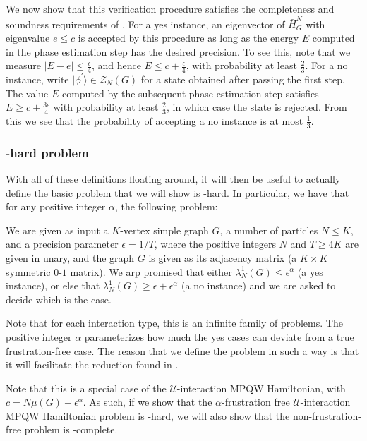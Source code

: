 \documentclass[../thesis-main/thesis-main]{subfiles}
\begin{document}
We now show that this verification procedure satisfies the completeness and soundness requirements of . For a yes instance, an eigenvector of $\bar{H}_{G}^{N}$ with eigenvalue $e\leq c$ is accepted by this procedure as long as the energy $E$ computed in the phase estimation step has the desired precision. To see this, note that we measure $\left|E-e\right|\leq\frac{\epsilon}{4}$, and hence $E\leq c+\frac{\epsilon}{4}$, with probability at least $\frac{2}{3}$.  For a no instance, write $|\phi^{\prime}\rangle\in\mathcal{Z}_{N}(G)$ for a state obtained after passing the first step. The value $E$ computed by the subsequent phase estimation step satisfies $E\geq c+\frac{3\epsilon}{4}$ with probability at least $\frac{2}{3}$, in which case the state is rejected. From this we see that the probability of accepting a no instance is at most $\frac{1}{3}$.





\subsubsection{\QMA-hard problem}

With all of these definitions floating around, it will then be useful to actually define the basic problem that we will show is \QMA-hard.  In particular, we have that for any positive integer $\alpha$, the following problem:

\begin{problem}
  We are given as input a $K$-vertex simple graph $G$, a number of particles $N\leq K$, and a precision parameter $\epsilon = 1/T$, where the positive integers $N$ and $T \geq 4K$ are given in unary, and the graph $G$ is given as its adjacency matrix (a $K\times K$ symmetric $0$-$1$ matrix). We arp promised that either $\lambda_N^1(G) \leq \epsilon^\alpha$ (a yes instance), or else that $\lambda_N^1(G) \geq \epsilon + \epsilon^\alpha$ (a no instance) and we are asked to decide which is the case.
\end{problem}

Note that for each interaction type, this is an infinite family of problems.  The positive integer $\alpha$ parameterizes how much the yes cases can deviate from a true frustration-free case.  The reason that we define the problem in such a way is that it will facilitate the reduction found in .

Note that this is a special case of the $\mathcal{U}$-interaction MPQW Hamiltonian, with $c = N\mu(G) + \epsilon^\alpha$.  As such, if we show that the $\alpha$-frustration free $\mathcal{U}$-interaction MPQW Hamiltonian problem is \QMA-hard, we will also show that the non-frustration-free problem is \QMA-complete.
\end{document}
